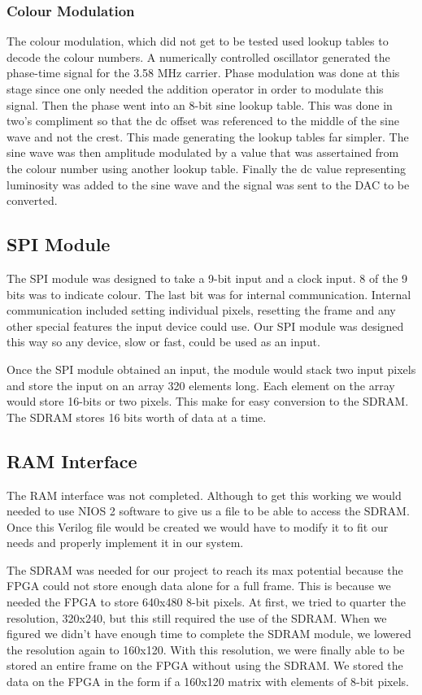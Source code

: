 \subsubsection{Colour Modulation}

The colour modulation, which did not get to be tested used lookup tables to
decode the colour numbers. A numerically controlled oscillator generated the
phase-time signal for the 3.58 MHz carrier. Phase modulation was done at this
stage since one only needed the addition operator in order to modulate this
signal. Then the phase went into an 8-bit sine lookup table. This was done in
two's compliment so that the dc offset was referenced to the middle of the sine
wave and not the crest. This made generating the lookup tables far simpler. The
sine wave was then amplitude modulated by a value that was assertained from the
colour number using another lookup table. Finally the dc value representing
luminosity was added to the sine wave and the signal was sent to the DAC to be
converted.

\subsection{SPI Module}

The SPI module was designed to take a 9-bit input and a clock input. 8 of the
9 bits was to indicate colour. The last bit was for internal communication. 
Internal communication included setting individual pixels, resetting the frame 
and any other special features the input device could use. Our SPI module was
designed this way so any device, slow or fast, could be used as an input.

Once the SPI module obtained an input, the module would stack two input pixels
and store the input on an array 320 elements long. Each element on the array 
would store 16-bits or two pixels. This make for easy conversion to the SDRAM.
The SDRAM stores 16 bits worth of data at a time.

\subsection{RAM Interface}

The RAM interface was not completed. Although to get this working we would 
needed to use NIOS 2 software to give us a file to be able to access the 
SDRAM. Once this Verilog file would be created we would have to modify it to
fit our needs and properly implement it in our system.

The SDRAM was needed for our project to reach its max potential because the FPGA
could not store enough data alone for a full frame. This is because we needed 
the FPGA to store 640x480 8-bit pixels. At first, we tried to quarter the 
resolution, 320x240, but this still required the use of the SDRAM. When we 
figured we didn’t have enough time to complete the SDRAM module, we lowered the 
resolution again to 160x120. With this resolution, we were finally able to be 
stored an entire frame on the FPGA without using the SDRAM. We stored the data 
on the FPGA in the form if a 160x120 matrix with elements of 8-bit pixels.

